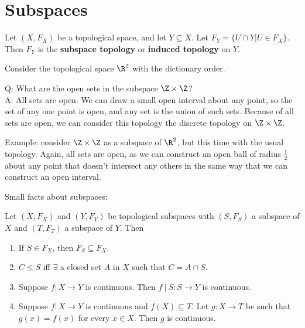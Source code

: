 \section{Subspaces}

\begin{definition}
Let $(X, F_X)$ be a topological space, and let $Y\subseteq X$.  Let $F_Y = \{U \cap Y | U\in F_X\}$.  Then $F_Y$ is the {\bf subspace topology} or {\bf induced topology} on $Y$.
\end{definition}

\begin{example}
Consider the topological space $\R^2$ with the dictionary order.
\end{example}

Q: What are the open sets in the subspace $\Z \times \Z$?\\
A: All sets are open.  We can draw a small open interval about any point, so the set of any one point is open, and any set is the union of such sets.  Because of all sets are open, we can consider this topology the discrete topology on $\Z \times \Z$.

Example:  consider $\Z \times \Z$ as a subspace of $\R^2$, but this time with the usual topology.  Again, all sets are open, as we can construct an open ball of radius $\frac12$ about any point that doesn't intersect any others in the same way that we can construct an open interval.

Small facts about subspaces:

Let $(X, F_X)$ and $(Y, F_Y)$ be topological subspaces with $(S, F_S)$ a subspace of $X$ and $(T, F_T)$ a subspace of $Y$.  Then
\begin{enumerate}
\item If $S\in F_X$, then $F_S \subseteq F_X$.
\item $C\le S$ iff $\exists$ a closed set $A$ in $X$ such that $C = A\cap S$.
\item Suppose $f:X\to Y$ is continuous.  Then $f\ |\ S : S \to Y$ is continuous.
\item Suppose $f:X\to Y$ is continuous and $f(X) \subseteq T$.  Let $g:X\to T$ be such that $g(x) = f(x) $ for every $x\in X$.  Then $g$ is continuous.
\end{enumerate}

